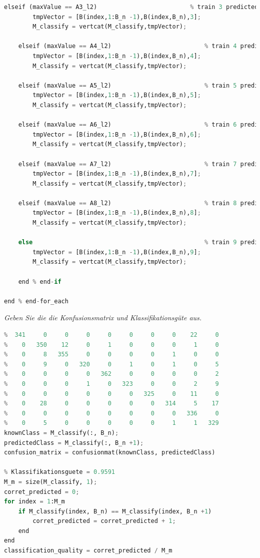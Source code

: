 \documentclass[12pt]{article}
\begin{document}
\begin{lstlisting}[language=Python]
    elseif (maxValue == A3_l2)                          % train 3 predicted
        tmpVector = [B(index,1:B_n -1),B(index,B_n),3];
        M_classify = vertcat(M_classify,tmpVector);

    elseif (maxValue == A4_l2)                          % train 4 predicted
        tmpVector = [B(index,1:B_n -1),B(index,B_n),4];
        M_classify = vertcat(M_classify,tmpVector);

    elseif (maxValue == A5_l2)                          % train 5 predicted
        tmpVector = [B(index,1:B_n -1),B(index,B_n),5];
        M_classify = vertcat(M_classify,tmpVector);

    elseif (maxValue == A6_l2)                          % train 6 predicted
        tmpVector = [B(index,1:B_n -1),B(index,B_n),6];
        M_classify = vertcat(M_classify,tmpVector);

    elseif (maxValue == A7_l2)                          % train 7 predicted
        tmpVector = [B(index,1:B_n -1),B(index,B_n),7];
        M_classify = vertcat(M_classify,tmpVector);
    
    elseif (maxValue == A8_l2)                          % train 8 predicted
        tmpVector = [B(index,1:B_n -1),B(index,B_n),8];
        M_classify = vertcat(M_classify,tmpVector);
    
    else                                                % train 9 predicted
        tmpVector = [B(index,1:B_n -1),B(index,B_n),9];
        M_classify = vertcat(M_classify,tmpVector);

    end % end-if

end % end-for_each
\end{lstlisting}

\textit{Geben ​Sie die die Konfusionsmatrix und Klassifikationsgüte aus​.}
\\
\begin{lstlisting}[language=Python]
% Konfusionsmatrix (Rows: actual classes, Columns: predicted classes)
%  341     0     0     0     0     0     0     0    22     0
%    0   350    12     0     1     0     0     0     1     0
%    0     8   355     0     0     0     0     1     0     0
%    0     9     0   320     0     1     0     1     0     5
%    0     0     0     0   362     0     0     0     0     2
%    0     0     0     1     0   323     0     0     2     9
%    0     0     0     0     0     0   325     0    11     0
%    0    28     0     0     0     0     0   314     5    17
%    0     0     0     0     0     0     0     0   336     0
%    0     5     0     0     0     0     0     1     1   329
knownClass = M_classify(:, B_n);
predictedClass = M_classify(:, B_n +1);
confusion_matrix = confusionmat(knownClass, predictedClass)

% Klassifikationsguete = 0.9591
M_m = size(M_classify, 1);
corret_predicted = 0;
for index = 1:M_m
    if M_classify(index, B_n) == M_classify(index, B_n +1)
        corret_predicted = corret_predicted + 1;
    end
end
classification_quality = corret_predicted / M_m
\end{lstlisting}
\end{document}
